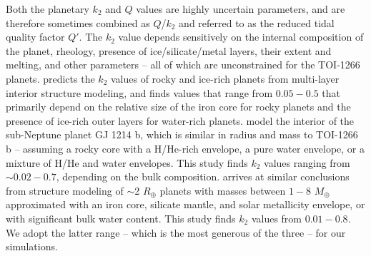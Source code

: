 \documentclass[twocolumn]{aastex631}
\begin{document}
Both the planetary $k_2$ and $Q$ values are highly uncertain parameters, and are therefore sometimes combined as $Q$/$k_2$ and referred to as the reduced tidal quality factor $Q'$. The $k_2$ value depends sensitively on the internal composition of the planet, rheology, presence of ice/silicate/metal layers, their extent and melting, and other parameters -- all of which are unconstrained for the TOI-1266 planets. \cite{Tobie2019} predicts the $k_2$ values of rocky and ice-rich planets from multi-layer interior structure modeling, and finds values that range from $0.05 - 0.5$ that primarily depend on the relative size of the iron core for rocky planets and the presence of ice-rich outer layers for water-rich planets. \cite{Nettelmann2011} model the interior of the sub-Neptune planet GJ 1214 b, which is similar in radius and mass to TOI-1266 b -- assuming a rocky core with a H/He-rich envelope, a pure water envelope, or a mixture of H/He and water envelopes. This study finds $k_2$ values ranging from $\sim0.02 - 0.7$, depending on the bulk composition.  \cite{Kellermann2018} arrives at similar conclusions from structure modeling of $\sim$2 $R_{\oplus}$ planets with masses between $1-8$ $M_{\oplus}$ approximated with an iron core, silicate mantle, and solar metallicity envelope, or with significant bulk water content. This study finds $k_2$ values from $0.01 - 0.8$. We adopt the latter range -- which is the most generous of the three -- for our simulations.
\end{document}
